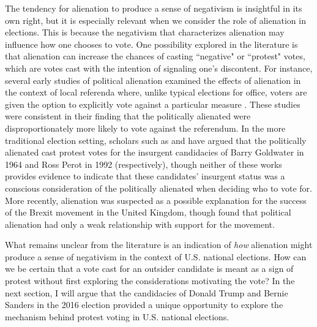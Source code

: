 \documentclass[12pt]{article}
\begin{document}
The tendency for alienation to produce a sense of negativism is insightful in its own right, but it is especially relevant when we consider the role of alienation in elections. This is because the negativism that characterizes alienation may influence how one chooses to vote. One possibility explored in the literature is that alienation can increase the chances of casting ``negative" or ``protest" votes, which are votes cast with the intention of signaling one's discontent. For instance, several early studies of political alienation examined the effects of alienation in the context of local referenda where, unlike typical elections for office, voters are given the option to explicitly vote against a particular measure \parencite{mcdill1962status,horton1962powerlessness,thompson1960}. These studies were consistent in their finding that the politically alienated were disproportionately more likely to vote against the referendum. In the more traditional election setting, scholars such as \textcite{aberbach1969alienation} and \textcite{southwell1998electoral} have argued that the politically alienated cast protest votes for the insurgent candidacies of Barry Goldwater in 1964 and Ross Perot in 1992 (respectively), though neither of these works provides evidence to indicate that these candidates' insurgent status was a conscious consideration of the politically alienated when deciding who to vote for. More recently, alienation was suspected as a possible explanation for the success of the Brexit movement in the United Kingdom, though \textcite{fox2020political} found that political alienation had only a weak relationship with support for the movement.

What remains unclear from the literature is an indication of \textit{how} alienation might produce a sense of negativism in the context of U.S. national elections. How can we be certain that a vote cast for an outsider candidate is meant as a sign of protest without first exploring the considerations motivating the vote? In the next section, I will argue that the candidacies of Donald Trump and Bernie Sanders in the 2016 election provided a unique opportunity to explore the mechanism behind protest voting in U.S. national elections. 


\end{document}
